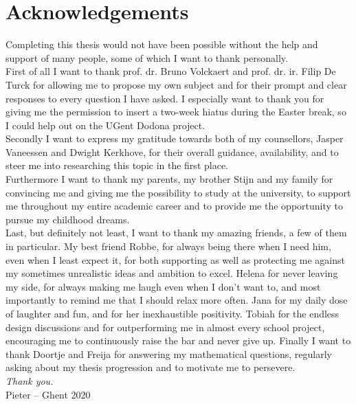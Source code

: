 
\chapter*{Acknowledgements}

Completing this thesis would not have been possible without the help and support of many people, some of which I want to thank personally.\\

\noindent First of all I want to thank prof. dr. Bruno Volckaert and prof. dr. ir. Filip De Turck for allowing me to propose my own subject and for their prompt and clear responses to every question I have asked. I especially want to thank you for giving me the permission to insert a two-week hiatus during the Easter break, so I could help out on the UGent Dodona project.\\

\noindent Secondly I want to express my gratitude towards both of my counsellors, Jasper Vaneessen and Dwight Kerkhove, for their overall guidance, availability, and to steer me into researching this topic in the first place.\\

\noindent Furthermore I want to thank my parents, my brother Stijn and my family for convincing me and giving me the possibility to study at the university, to support me throughout my entire academic career and to provide me the opportunity to pursue my childhood dreams.\\

\noindent Last, but definitely not least, I want to thank my amazing friends, a few of them in particular. My best friend Robbe, for always being there when I need him, even when I least expect it, for both supporting as well as protecting me against my sometimes unrealistic ideas and ambition to excel. Helena for never leaving my side, for always making me laugh even when I don't want to, and most importantly to remind me that I should relax more often. Jana for my daily dose of laughter and fun, and for her inexhaustible positivity. Tobiah for the endless design discussions and for outperforming me in almost every school project, encouraging me to continuously raise the bar and never give up. Finally I want to thank Doortje and Freija for answering my mathematical questions, regularly asking about my thesis progression and to motivate me to persevere.\\

\noindent \emph{Thank you.}\\

\noindent Pieter -- Ghent 2020